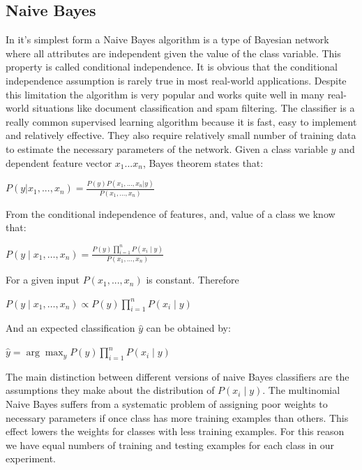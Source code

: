 \subsection{Naive Bayes}
In it's simplest form a Naive Bayes algorithm is a type of Bayesian network where all attributes are independent given the value of the class variable. This property is called conditional independence. It is obvious that the conditional independence assumption is rarely true in most real-world applications\cite{zhang2004optimality}. Despite this limitation the algorithm is very popular and works quite well in many real-world situations like document classification and spam filtering. The classifier is a really common supervised learning algorithm because it is fast, easy to implement and relatively effective. They also require relatively small number of training data to estimate the necessary parameters of the network\cite{scikit-learn}. Given a class variable $y$ and dependent feature vector $x_{1}$...$x_{n}$, Bayes theorem states that:
\begin{center}
    $P(y|x_{1},...,x_{n}) = \frac{P(y)P(x_{1},...,x_{n}|y)}{P(x_{1},...,x_{n})}$
\end{center}
From the conditional independence of features, and, value of a class we know that: 
\begin{center}
$P(y \mid x_1, \dots, x_n) = \frac{P(y) \prod_{i=1}^{n} P(x_i \mid y)}
                                 {P(x_1, \dots, x_n)}$
\end{center}
For a given input $P(x_{1},...,x_{n})$ is constant. Therefore 
\begin{center}
$P(y \mid x_1, \dots, x_n) \propto P(y) \prod_{i=1}^{n} P(x_i \mid y)$
\end{center}
And an expected classification $\hat{y}$ can be obtained by:
\begin{center}
$\hat{y} = \arg\max_y P(y) \prod_{i=1}^{n} P(x_i \mid y)$
\end{center}
The main distinction between different versions of naive Bayes classifiers are the assumptions they make about the distribution of $P(x_i \mid y)$\cite{scikit-learn}. The multinomial Naive Bayes suffers from a systematic problem of assigning poor weights to necessary parameters if once class has more training examples than others. This effect lowers the weights for classes with less training examples\cite{rennie2003tackling}. For this reason we have equal numbers of training and testing examples for each class in our experiment. 

